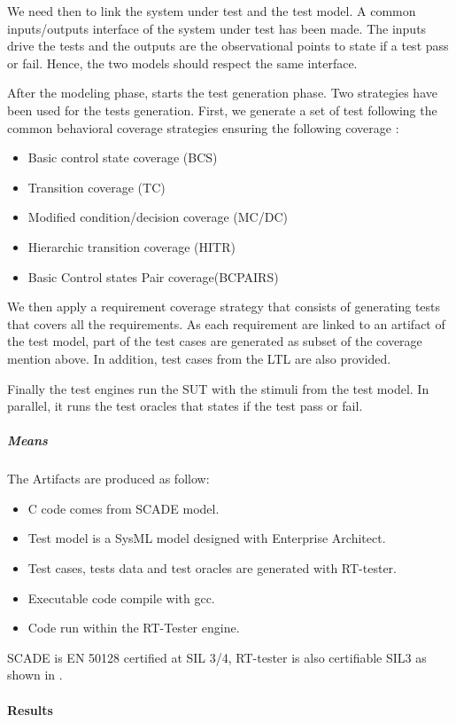 We need then to link the system under test and the test model.  A
common inputs/outputs interface of the system under test has been
made. The inputs drive the tests and the outputs are the observational
points to state if a test pass or fail. Hence, the two models should
respect the same interface.

After the modeling phase, starts the test generation phase.
Two strategies have been used for the tests generation. First, we
generate a set of test following the common behavioral coverage
strategies ensuring the following coverage :
\begin{itemize}
\item  Basic control state coverage (BCS)
\item  Transition coverage (TC)
\item  Modified condition/decision coverage (MC/DC)
\item  Hierarchic transition coverage (HITR)
\item  Basic Control states Pair coverage(BCPAIRS)
\end{itemize}
We then apply a requirement coverage strategy that consists of
generating tests that covers all the requirements. As each requirement
are linked to an artifact of the test model, part of the test cases
are generated as subset of the coverage mention above. In addition,
test cases from the LTL are also provided.


Finally the test engines run the SUT with the stimuli from the test
model. In parallel, it runs the test oracles that states if the test
pass or fail.

\subparagraph{Means}

The Artifacts are produced as follow:
\begin{itemize}
\item C code comes from SCADE model.
\item Test model is a SysML model designed with Enterprise Architect.
\item Test cases, tests data and test oracles are generated with RT-tester.
\item Executable code compile with gcc.
\item Code run within the RT-Tester engine.
\end{itemize}

SCADE is EN 50128 certified at SIL 3/4, RT-tester is also certifiable
SIL3 as shown in \cite{peleska_efficient_2012}.

\paragraph{Results}

